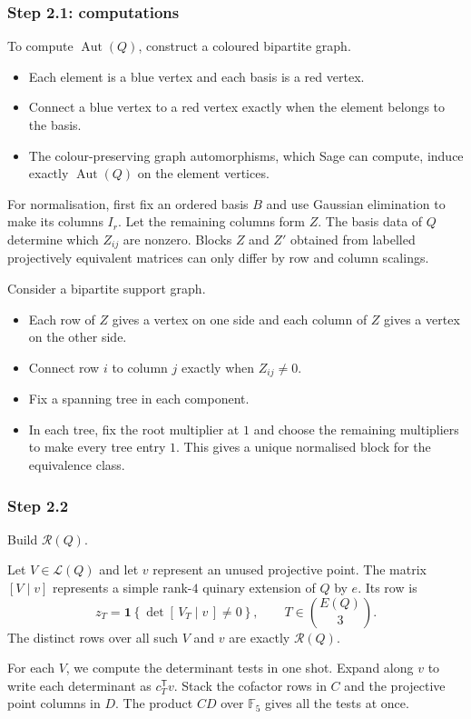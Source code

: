 \documentclass{beamer}
\newcommand{\F}{\mathbb{F}}
\newcommand{\RR}{\mathcal R}
\newcommand{\Aut}{\operatorname{Aut}}
\begin{document}
\begin{frame}
  \frametitle{Step 2.1: computations}
  To compute $\Aut(Q)$, construct a coloured bipartite graph.
  \begin{itemize}
    \item Each element is a blue vertex and each basis is a red vertex.
    \item Connect a blue vertex to a red vertex exactly when the element
      belongs to the basis.
    \item The colour-preserving graph automorphisms, which Sage can compute,
      induce exactly $\Aut(Q)$ on the element vertices.
  \end{itemize}
\end{frame}
\begin{frame}
  For normalisation, first fix an ordered basis $B$ and use Gaussian
  elimination to make its columns $I_r$. Let the remaining columns
  form $Z$. The basis data of $Q$ determine which $Z_{ij}$ are
  nonzero. Blocks $Z$ and $Z'$ obtained from labelled projectively
  equivalent matrices can only differ by row and column scalings.

  Consider a bipartite support graph.
  \begin{itemize}
    \item Each row of $Z$ gives a vertex on one side and each column
      of $Z$ gives a vertex on the other side.
    \item Connect row $i$ to column $j$ exactly when $Z_{ij}\ne0$.
    \item Fix a spanning tree in each component.
    \item In each tree, fix the root multiplier at $1$ and choose the
      remaining multipliers to make every tree entry $1$. This gives a
      unique normalised block for the equivalence class.
  \end{itemize}
\end{frame}

\begin{frame}
  \frametitle{Step 2.2}
  Build $\RR(Q)$.

  \par Let $V\in\mathcal L(Q)$ and let $v$ represent an unused
  projective point. The matrix $[V\mid v]$ represents a simple rank-$4$
  quinary extension of $Q$ by $e$. Its row is
  \[
    z_T=\mathbf 1\!\left\{\det[\,V_T\mid v\,]\ne0\right\},
    \qquad T\in\binom{E(Q)}3.
  \]
  The distinct rows over all such $V$ and $v$ are exactly $\RR(Q)$.

  \par For each $V$, we compute the determinant tests in one shot.
  Expand along $v$ to write each determinant as $c_T^{\mathsf T}v$.
  Stack the cofactor rows in $C$ and the projective point columns in
  $D$. The product $CD$ over $\F_5$ gives all the tests at once.
\end{frame}
\end{document}

